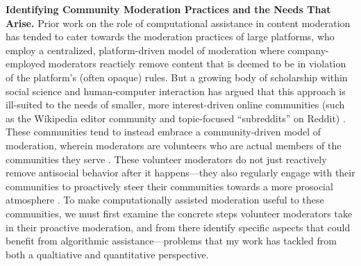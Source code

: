 \documentclass[11pt,letterpaper]{article}
\renewcommand{\section}[1]{\vspace{0.25\baselineskip}\noindent\textbf{#1.}}
\begin{document}
\section{Identifying Community Moderation Practices and the Needs That Arise}
Prior work on the role of computational assistance in content moderation has tended to cater towards the moderation practices of large platforms, who employ a centralized, platform-driven model of moderation where company-employed moderators reactiely remove content that is deemed to be in violation of the platform's (often opaque) rules.
But a growing body of scholarship within social science and human-computer interaction has argued that this approach is ill-suited to the needs of smaller, more interest-driven online communities (such as the Wikipedia editor community and topic-focused ``subreddits'' on Reddit) \cite{jurgens_just_2019,seering_reconsidering_2020}.
These communities tend to instead embrace a community-driven model of moderation, wherein moderators are volunteers who are actual members of the communities they serve \cite{gilbert_i_2020,lo_when_2018}.
These volunteer moderators do not just reactively remove antisocial behavior after it happens---they also regularly engage with their communities to proactively steer their communities towards a more prosocial atmosphere \cite{seering_shaping_2017,cai_what_2019,billings_understanding_2010}.
To make computationally assisted moderation useful to these communities, we must first examine the concrete steps volunteer moderators take in their proactive moderation, and from there identify specific aspects that could benefit from algorithmic assistance---problems that my work has tackled from both a qualtiative and quantitative perspective.
\end{document}
